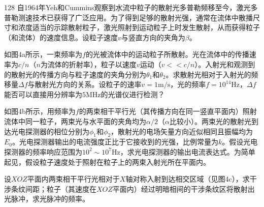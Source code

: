 \begin{problem}[第37届全国中学生物理竞赛决赛][激光多普勒测速]{128}
    自1964年Yeh和Cummins观察到水流中粒子的散射光多普勒频移至今，激光多普勒测速技术已获得了广泛应用。为了得到足够的散射光强，通常在流体中散播尺寸和浓度适当的示踪散射粒子，激光照射到运动粒子上时发生散射，从而获得粒子（和流体）的速度信息。设粒子速度$v$与竖直方向的夹角为$\beta$。
    \begin{subproblem}
        如图4a所示，一束频率为$f$的光被流体中的运动粒子所散射。光在流体中的传播速率为$c / n$（$n$为流体的折射率），粒子以速度$v$运动（$v << c/n$）。入射光和观测到的散射光的传播方向与粒子速度的夹角分别为$\theta _ { 1 }$和$\theta _ { 2 }$。求散射光相对于入射光的频移量$\Delta f$与散射光方向的关系。设粒子的速率$v = 1 \mathrm{m/s}$，光的频率$f = 10^{14} \mathrm{Hz}$，$\Delta f$能否可以直接用分辨率为$5\mathrm{MHz}$的光谱仪进行检测？
    \end{subproblem}
    \begin{subproblem}
        如图4b所示，用频率为$f$的两束相干平行光（其传播方向在同一竖直平面内）照射流体中同一粒子，两束光与水平面的夹角均为$\alpha / 2$（$\alpha$比较小）。两束光的散射光到达光电探测器的相位分别为$\phi _ { 1 }$和$\phi _ { 2 }$，散射光的电场矢量方向近似相同且振幅均为$E _ { 0 }$。光电探测器输出的电流强度正比于它接收到的光强，比例常量为$k$。假设光电探测器的频率响应范围为$10^{2} \sim 10^{7} \mathrm{Hz}$，求光电探测器的输出电流表达式。为简单起见，假设粒子速度处于照射在粒子上的两束入射光所在平面内。
    \end{subproblem}
    \begin{subproblem}
        设$XOZ$平面内两束相干平行光相对于$X$轴对称入射到达相交区域（见图4c），求干涉条纹间距；粒子（其速度在$XOZ$平面内）经过明暗相间的干涉条纹区将散射出光脉冲，求光脉冲的频率。
    \end{subproblem}
\end{problem}
